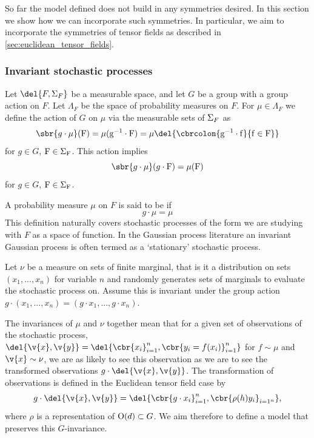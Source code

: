 So far the model defined does not build in any symmetries desired.
In this section we show how we can incorporate such symmetries.
In particular, we aim to incorporate the symmetries of tensor fields as described in \cref{sec:euclidean_tensor_fields}.

\subsubsection{Invariant stochastic processes}
Let \(\del{F, \sigalg{F}}\) be a measurable space, and let \(G\) be a group with a group action on \(F\).
Let \(\Lambda_F\) be the space of probability measures on \(F\).
For \(\mu \in \Lambda_F\) we define the action of \(G\) on \(\mu\) via the measurable sets of \(\sigalg{F}\) as 
\[
	\sbr{g\cdot \mu}(\rm{F}) = \mu(g^{-1}\cdot \rm{F}) = \mu\del{\cbrcolon{g^{-1}\cdot f}{f\in \rm{F}}}
\]
for \(g\in G\), \(\rm{F}\in \sigalg{F}\).
This action implies
\[
	\sbr{g\cdot \mu}(g\cdot \rm{F}) = \mu(\rm{F})
\]
for \(g\in G\), \(\rm{F}\in \sigalg{F}\).

A probability measure \(\mu\) on \(F\) is said to be  if
\[
	g\cdot \mu = \mu
\]
This definition naturally covers stochastic processes of the form we are studying with \(F\) as a space of function.
In the Gaussian process literature an invariant Gaussian process is often termed as a `stationary' stochastic process.

Let \(\nu\) be a measure on sets of finite marginal, that is it a distribution on sets \((x_1, ..., x_n)\) for variable \(n\) and randomly generates sets of marginals to evaluate the stochastic process on.
Assume this is invariant under the group action \(g \cdot (x_1, ..., x_n) = (g\cdot x_1, ..., g\cdot x_n)\).

The invariances of \(\mu\) and \(\nu\) together mean that for a given set of observations of the stochastic process, \(\del{\v{x}, \v{y}} = \del{\cbr{x_i}_{i=1}^n, \cbr{y_i=f(x_i)}_{i=1}^n}\) for \(f\sim \mu\) and \(\v{x}\sim \nu\), we are as likely to see this observation as we are to see the transformed observations \(g \cdot \del{\v{x}, \v{y}}\).
The transformation of observations is defined in the Euclidean tensor field case by \[g \cdot \del{\v{x}, \v{y}} = \del{\cbr{g \cdot x_i}_{i=1}^n, \cbr{\rho(h) y_i}_{i=1^n}}\label{eq:sample_transform_euclidean},\]
where \(\rho\) is a representation of \(\groupO[d]{} \subset G\).
We aim therefore to define a model that preserves this \(G\)-invariance.

